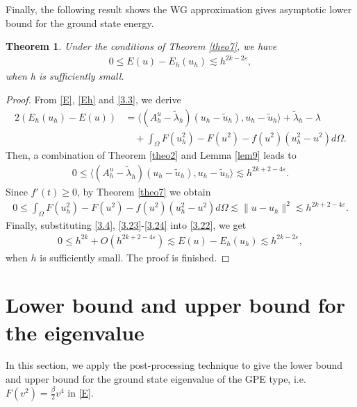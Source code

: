 \documentclass[compress, preprint,9pt]{elsarticle}
\numberwithin{equation}{section}
\newtheorem{theo}{Theorem}[section]
\newcommand{\eps}{\varepsilon}
\newcommand{\la}{\langle}
\newcommand{\ran}{\rangle}
\begin{document}
Finally, the following result shows the WG approximation gives asymptotic lower bound for the ground state energy.
\begin{theo}\label{theo10}
	Under the conditions of Theorem \ref{theo7}, we have
	\begin{eqnarray*}
		0\le E(u)-E_h(u_h)\lesssim h^{2k-2\eps},
	\end{eqnarray*}
	when h is sufficiently small.
\end{theo}
\begin{proof}
	From \eqref{E}, \eqref{Eh} and \eqref{3.3}, we derive
	\begin{equation}\label{3.22}
		\begin{aligned}
			2(E_h(u_h)-E(u))&=\la (A_h^u-\widetilde{\lambda}_h) (u_h-\widetilde{u}_h),u_h-\widetilde{u}_h\ran+\widetilde{\lambda}_h-\lambda\\
			&\quad+\int_\Omega F(u_h^2)-F(u^2)-f(u^2)(u_h^2-u^2) d\Omega.
		\end{aligned}
	\end{equation}
	Then, a combination of Theorem \ref{theo2} and Lemma \ref{lem9} leads to
	\begin{eqnarray}\label{3.23}
		0\le\la (A_h^u-\widetilde{\lambda}_h) (u_h-\widetilde{u}_h),u_h-\widetilde{u}_h\ran\lesssim h^{2k+2-4\eps}.
	\end{eqnarray}
	Since $f'(t)\ge0$, by Theorem \ref{theo7} we obtain
	\begin{eqnarray}\label{3.24}
		0\le\int_\Omega F(u_h^2)-F(u^2)-f(u^2)(u_h^2-u^2) d\Omega\lesssim \|u-u_h\|^2\lesssim h^{2k+2-4\eps}.
	\end{eqnarray}
	Finally, substituting \eqref{3.4}, \eqref{3.23}-\eqref{3.24} into \eqref{3.22}, we get
	\begin{eqnarray*}
		0\le h^{2k}+O(h^{2k+2-4\eps})\lesssim E(u)-E_h(u_h)\lesssim h^{2k-2\eps},
	\end{eqnarray*}
	when $h$ is sufficiently small. The proof is finished.
\end{proof}

\section{Lower bound and upper bound for the eigenvalue}
In this section, we apply the post-processing technique to give the lower bound and upper bound for the ground state eigenvalue of the GPE type, i.e. $F(v^2)=\frac{\beta}{2}v^4$ in \eqref{E}.
\end{document}
